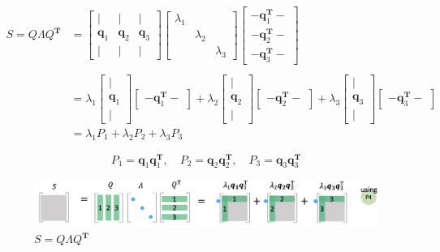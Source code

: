 \documentclass[letterpaper]{article}
\begin{document}
\begin{align*}
  S = Q \Lambda Q^\mathbf{T}
&= \begin{bmatrix}
    | & | & |\\
    \bm{q}_1 & \bm{q}_2 & \bm{q}_3\\
    | & | & |
  \end{bmatrix}
  \begin{bmatrix}
    \lambda_1 \\
           & \lambda_2 & \\
           & & \lambda_3
  \end{bmatrix}
  \begin{bmatrix}
  - \bm{q}_1^\mathbf{T} -\\
  - \bm{q}_2^\mathbf{T} -\\
  - \bm{q}_3^\mathbf{T} -
  \end{bmatrix}\\
  \\
  &=
  \lambda_1 \begin{bmatrix}
    |\\
    \bm{q}_1\\
    |
  \end{bmatrix}
  \begin{bmatrix}
    - \bm{q}_1^\mathbf{T} - 
  \end{bmatrix}
  +
  \lambda_2 \begin{bmatrix}
  |\\
  \bm{q}_2\\
  |
  \end{bmatrix}
  \begin{bmatrix}
  - \bm{q}_2^\mathbf{T} -
  \end{bmatrix} 
  +
  \lambda_3 \begin{bmatrix}
    |\\
    \bm{q}_3 \\
    |
  \end{bmatrix}
  \begin{bmatrix}
    - \bm{q}_3^\mathbf{T} -
  \end{bmatrix} \\
&= \lambda_1 P_1 + \lambda_2 P_2 + \lambda_3 P_3
\end{align*}

\begin{equation*}
  P_1=\bm{q}_1 \bm{q}_1^\mathbf{T}, \quad P_2=\bm{q}_2 \bm{q}_2^\mathbf{T}, \quad P_3=\bm{q}_3 \bm{q}_3^\mathbf{T}
\end{equation*}


\begin{figure}[H]
  \includegraphics[keepaspectratio, width=\linewidth]{EVD.png}
  \caption{$S=Q \Lambda Q^\mathbf{T}$}
\end{figure}
\end{document}
